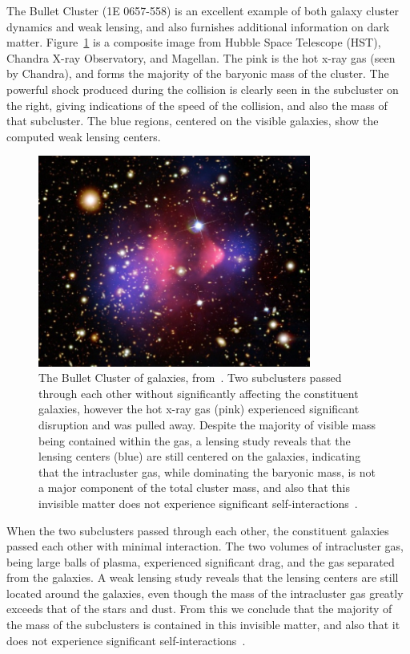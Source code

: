 The Bullet Cluster (1E 0657-558) is an excellent example of both galaxy cluster dynamics and weak lensing, and also furnishes additional information on dark matter. Figure~\ref{fig:bullet_cluster} is a composite image from Hubble Space Telescope (HST), Chandra X-ray Observatory, and Magellan. The pink is the hot x-ray gas (seen by Chandra), and forms the majority of the baryonic mass of the cluster. The powerful shock produced during the collision is clearly seen in the subcluster on the right, giving indications of the speed of the collision, and also the mass of that subcluster. The blue regions, centered on the visible galaxies, show the computed weak lensing centers.

\begin{figure}[htb]
\centering
   \includegraphics[width=0.8\textwidth]{figures/dm/bullet_cluster}
   \caption{The Bullet Cluster of galaxies, from~\cite{bullet}. Two subclusters passed through each other without significantly affecting the constituent galaxies, however the hot x-ray gas (pink) experienced significant disruption and was pulled away. Despite the majority of visible mass being contained within the gas, a lensing study reveals that the lensing centers (blue) are still centered on the galaxies, indicating that the intracluster gas, while dominating the baryonic mass, is not a major component of the total cluster mass, and also that this invisible matter does not experience significant self-interactions~\cite{Kahlhoefer:2013dca}.}\label{fig:bullet_cluster}
\end{figure}

When the two subclusters passed through each other, the constituent galaxies passed each other with minimal interaction. The two volumes of intracluster gas, being large balls of plasma, experienced significant drag, and the gas separated from the galaxies. A weak lensing study reveals that the lensing centers are still located around the galaxies, even though the mass of the intracluster gas greatly exceeds that of the stars and dust. From this we conclude that the majority of the mass of the subclusters is contained in this invisible matter, and also that it does not experience significant self-interactions~\cite{Kahlhoefer:2013dca}.

